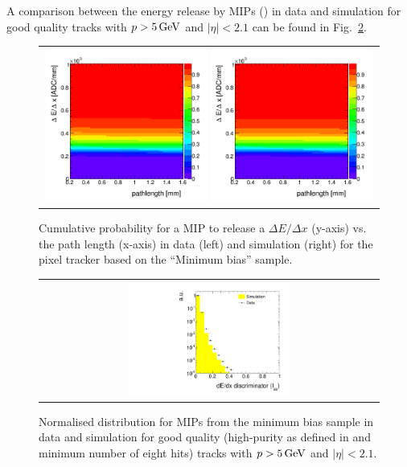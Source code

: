 A comparison between the energy release by MIPs (\ias) in data and simulation for good quality tracks with $p>5\,\text{Ge}\kern-0.06667em\text{V}$ and $|\eta|<2.1$ can be found in Fig.~\ref{fig:Data-MC-Dedx_MIPs}.
\begin{figure}[!tb]
  \centering 
  \begin{tabular}{c}
    \includegraphics[width=0.49\textwidth]{figures/analysis/Discriminator_template_data_pixel_2012.png}
    \includegraphics[width=0.49\textwidth]{figures/analysis/Discriminator_template_mc_pixel_2012.png}
  \end{tabular}
  \caption{Cumulative probability for a MIP to release a $\Delta E/ \Delta x$ (y-axis) vs. the path length (x-axis) in data (left) and simulation (right) for the pixel tracker based on the ``Minimum bias'' sample.}
  \vspace{60pt}
  \label{fig:ProbabilityTemplate}
\end{figure}
\begin{figure}[!bt]
  \centering 
  \begin{tabular}{c}
    \includegraphics[width=0.49\textwidth]{figures/analysis/PixelCalibration/htrackASmiSmallRange_log_MIPs.pdf}
  \end{tabular}
  \caption{Normalised \ias distribution for MIPs from the minimum bias sample in data and simulation for good quality (high-purity as defined in \cite{bib:CMS:Tracking_2010} and minimum number of eight hits) tracks with $p>5\,\text{Ge}\kern-0.06667em\text{V}$ and $|\eta|<2.1$.}
  \label{fig:Data-MC-Dedx_MIPs}
\end{figure}
